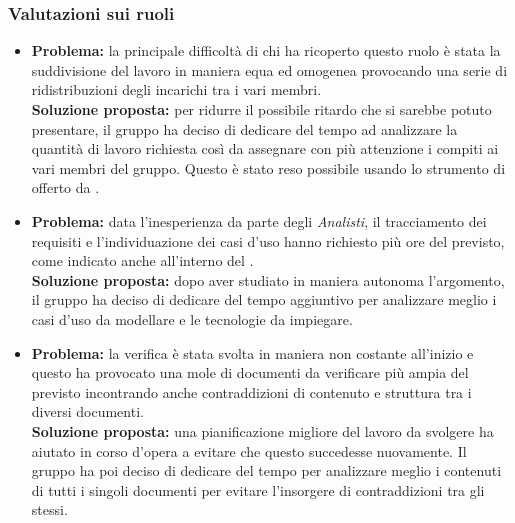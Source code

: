 \subsubsection{Valutazioni sui ruoli}
\begin{itemize}
	\item \textbf{Problema:} la principale difficoltà di chi ha ricoperto questo ruolo è stata la suddivisione del lavoro in maniera equa ed omogenea provocando una serie di ridistribuzioni degli incarichi tra i vari membri.\\
	\textbf{Soluzione proposta:} per ridurre il possibile ritardo che si sarebbe potuto presentare, il gruppo ha deciso di dedicare del tempo ad analizzare la quantità di lavoro richiesta così da assegnare con più attenzione i compiti ai vari membri del gruppo. Questo è stato reso possibile usando lo strumento di  offerto da .
\end{itemize}
\begin{itemize}
	\item \textbf{Problema:} data l'inesperienza da parte degli \textit{Analisti}, il tracciamento dei requisiti e l'individuazione dei casi d'uso hanno richiesto più ore del previsto, come indicato anche all'interno del .\\
	\textbf{Soluzione proposta:} dopo aver studiato in maniera autonoma l'argomento, il gruppo ha deciso di dedicare del tempo aggiuntivo per analizzare meglio i casi d'uso da modellare e le tecnologie da impiegare.
\end{itemize}
\begin{itemize}
	\item \textbf{Problema:} la verifica è stata svolta in maniera non costante all'inizio e questo ha provocato una mole di documenti da verificare più ampia del previsto incontrando anche contraddizioni di contenuto e struttura tra i diversi documenti.\\
	\textbf{Soluzione proposta:} una pianificazione migliore del lavoro da svolgere ha aiutato in corso d'opera a evitare che questo succedesse nuovamente. Il gruppo ha poi deciso di dedicare del tempo per analizzare meglio i contenuti di tutti i singoli documenti per evitare l'insorgere di contraddizioni tra gli stessi.
\end{itemize}
